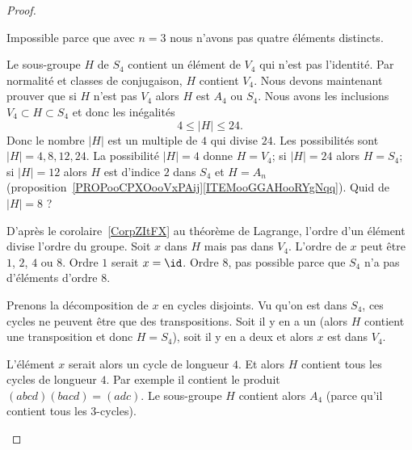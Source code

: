 \begin{proof}
\begin{subproof}
\begin{subproof}
                    Impossible parce que avec \( n=3\) nous n'avons pas quatre éléments distincts.

                \item[Si \( n=4\)]

                    Le sous-groupe \( H\) de \( S_4\) contient un élément de \( V_4\) qui n'est pas l'identité. Par normalité et classes de conjugaison, \( H\) contient \( V_4\). Nous devons maintenant prouver que si \( H\) n'est pas \( V_4\) alors \( H\) est \( A_4\) ou \( S_4\). Nous avons les inclusions \( V_4\subset H\subset S_4\) et donc les inégalités
                    \begin{equation}
                        4\leq | H |\leq 24.
                    \end{equation}
                    Donc le nombre \( | H |\) est un multiple de \( 4\) qui divise \( 24\). Les possibilités sont \( | H |=4,8,12,24\). La possibilité \( | H |=4\) donne \( H=V_4\); si \( |H |=24\) alors \( H=S_4\); si \( | H |=12\) alors \( H\) est d'indice \( 2\) dans \( S_4\) et \( H=A_n\) (proposition~\ref{PROPooCPXOooVxPAij}\ref{ITEMooGGAHooRYgNqq}). Quid de \( | H |=8\) ?

                    D'après le corolaire~\ref{CorpZItFX} au théorème de Lagrange, l'ordre d'un élément divise l'ordre du groupe. Soit \( x\) dans \( H\) mais pas dans \( V_4\). L'ordre de \( x\) peut être \( 1\), \( 2\), \( 4\) ou \( 8\). Ordre \( 1\) serait \( x=\id\). Ordre \( 8\), pas possible parce que \( S_4\) n'a pas d'éléments d'ordre \( 8\).
                    \begin{subproof}
                        \item[\( x\) d'ordre \( 2\)]

                            Prenons la décomposition de \( x\) en cycles disjoints. Vu qu'on est dans \( S_4\), ces cycles ne peuvent être que des transpositions. Soit il y en a un (alors \( H\) contient une transposition et donc \( H=S_4\)), soit il y en a deux et alors \( x\) est dans \( V_4\).

                        \item[\( x\) d'ordre \( 4\)]

                            L'élément \( x\) serait alors un cycle de longueur \( 4\). Et alors \( H\) contient tous les cycles de longueur \( 4\). Par exemple il contient le produit \( (abcd)(bacd)=(adc)\). Le sous-groupe \( H\) contient alors \( A_4\) (parce qu'il contient tous les \( 3\)-cycles).
                    \end{subproof}


\end{subproof}
\end{subproof}
\end{proof}
